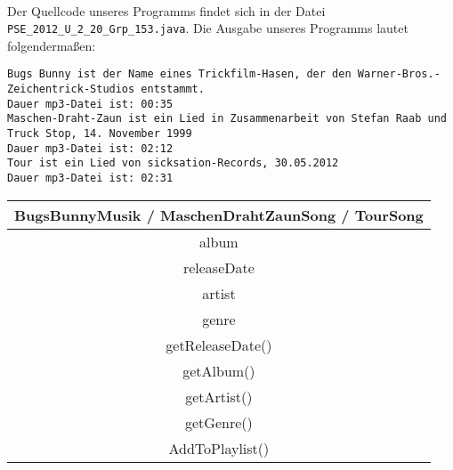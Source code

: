 \documentclass{mywork}
\begin{document}
\setcounter{aufgabe}{3}
\begin{aufgabe}~

	Der Quellcode unseres Programms findet sich in der Datei \verb|PSE_2012_U_2_20_Grp_153.java|.
	Die Ausgabe unseres Programms lautet folgendermaßen:

	\begin{lstlisting}[breaklines]
Bugs Bunny ist der Name eines Trickfilm-Hasen, der den Warner-Bros.-Zeichentrick-Studios entstammt.
Dauer mp3-Datei ist: 00:35
Maschen-Draht-Zaun ist ein Lied in Zusammenarbeit von Stefan Raab und Truck Stop, 14. November 1999
Dauer mp3-Datei ist: 02:12
Tour ist ein Lied von sicksation-Records, 30.05.2012
Dauer mp3-Datei ist: 02:31
	\end{lstlisting}

\end{aufgabe}

\begin{aufgabe}
	
	\begin{table}[h]
		\centering
		\begin{tabular}{|c|}
			\hline
			BugsBunnyMusik / MaschenDrahtZaunSong / TourSong \\ \hline
			album \\
			releaseDate \\
			artist \\
			genre \\ 
			\hline
			getReleaseDate() \\
			getAlbum() \\
			getArtist() \\
			getGenre() \\
			AddToPlaylist() \\ \hline
		\end{tabular}
	\end{table}
\end{aufgabe}
\end{document}
